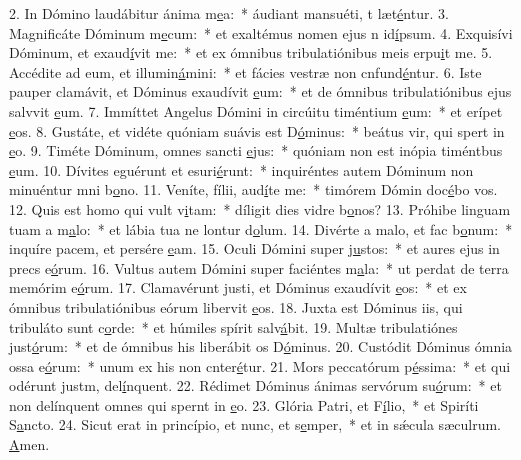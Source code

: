 2. In Dómino laudábitur ánima m\uline{e}a:~* áudiant mansuéti, t læt\uline{é}ntur.
3. Magnificáte Dóminum m\uline{e}cum:~* et exaltémus nomen ejus n id\uline{í}psum.
4. Exquisívi Dóminum, et exaud\uline{í}vit me:~* et ex ómnibus tribulatiónibus meis erpu\uline{i}t me.
5. Accédite ad eum, et illumin\uline{á}mini:~* et fácies vestræ non cnfund\uline{é}ntur.
6. Iste pauper clamávit, et Dóminus exaudívit \uline{e}um:~* et de ómnibus tribulatiónibus ejus salvvit \uline{e}um.
7. Immíttet Angelus Dómini in circúitu timéntium \uline{e}um:~* et erípet \uline{e}os.
8. Gustáte, et vidéte quóniam suávis est D\uline{ó}minus:~* beátus vir, qui spert in \uline{e}o.
9. Timéte Dóminum, omnes sancti \uline{e}jus:~* quóniam non est inópia timéntbus \uline{e}um.
10. Dívites eguérunt et esuri\uline{é}runt:~* inquiréntes autem Dóminum non minuéntur mni b\uline{o}no.
11. Veníte, fílii, aud\uline{í}te me:~* timórem Dómin doc\uline{é}bo vos.
12. Quis est homo qui vult v\uline{i}tam:~* díligit dies vidre b\uline{o}nos?
13. Próhibe linguam tuam a m\uline{a}lo:~* et lábia tua ne lontur d\uline{o}lum.
14. Divérte a malo, et fac b\uline{o}num:~* inquíre pacem, et persére \uline{e}am.
15. Oculi Dómini super j\uline{u}stos:~* et aures ejus in precs e\uline{ó}rum.
16. Vultus autem Dómini super faciéntes m\uline{a}la:~* ut perdat de terra memórim e\uline{ó}rum.
17. Clamavérunt justi, et Dóminus exaudívit \uline{e}os:~* et ex ómnibus tribulatiónibus eórum libervit \uline{e}os.
18. Juxta est Dóminus iis, qui tribuláto sunt c\uline{o}rde:~* et húmiles spírit salv\uline{á}bit.
19. Multæ tribulatiónes just\uline{ó}rum:~* et de ómnibus his liberábit os D\uline{ó}minus.
20. Custódit Dóminus ómnia ossa e\uline{ó}rum:~* unum ex his non cnter\uline{é}tur.
21. Mors peccatórum p\uline{é}ssima:~* et qui odérunt justm, del\uline{í}nquent.
22. Rédimet Dóminus ánimas servórum su\uline{ó}rum:~* et non delínquent omnes qui spernt in \uline{e}o.
23. Glória Patri, et F\uline{í}lio,~* et Spiríti S\uline{a}ncto.
24. Sicut erat in princípio, et nunc, et s\uline{e}mper,~* et in sǽcula sæculrum. \uline{A}men.
